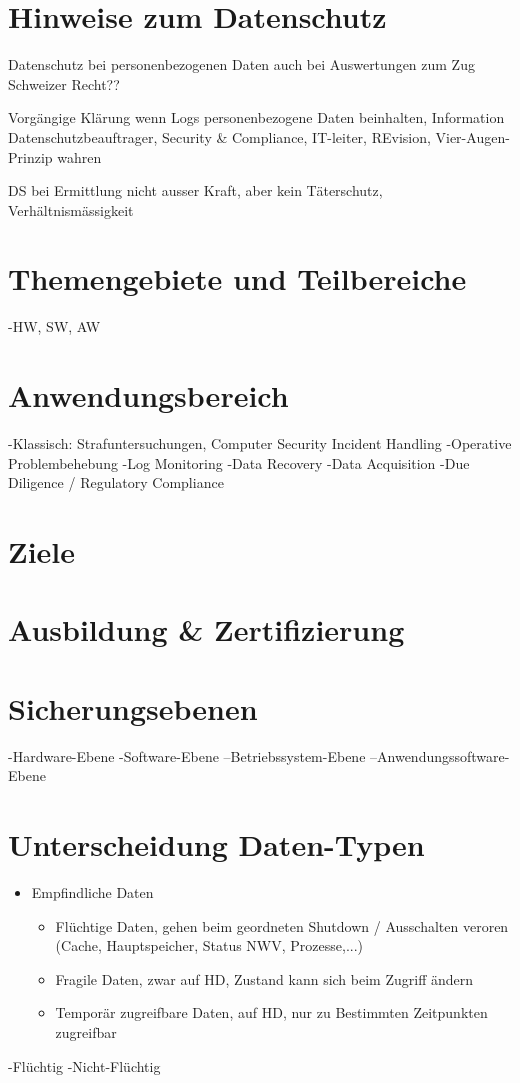 \section{Hinweise zum Datenschutz}
Datenschutz bei personenbezogenen Daten auch bei Auswertungen zum Zug
Schweizer Recht??

Vorgängige Klärung wenn Logs personenbezogene Daten beinhalten, Information Datenschutzbeauftrager, Security \& Compliance, IT-leiter, REvision, Vier-Augen-Prinzip wahren

DS bei Ermittlung nicht ausser Kraft, aber kein Täterschutz, Verhältnismässigkeit
\section{Themengebiete und Teilbereiche}
-HW, SW, AW
\section{Anwendungsbereich}

-Klassisch: Strafuntersuchungen, Computer Security Incident Handling
-Operative Problembehebung
-Log Monitoring
-Data Recovery
-Data Acquisition
-Due Diligence / Regulatory Compliance

\section{Ziele}

\section{Ausbildung \& Zertifizierung}


\section{Sicherungsebenen}
-Hardware-Ebene
-Software-Ebene
--Betriebssystem-Ebene
--Anwendungssoftware-Ebene

\section{Unterscheidung Daten-Typen}
\begin{itemize}
\item Empfindliche Daten
\begin{itemize}
\item Flüchtige Daten, gehen beim geordneten Shutdown / Ausschalten veroren (Cache, Hauptspeicher, Status NWV, Prozesse,...)
\item Fragile Daten, zwar auf HD, Zustand kann sich beim Zugriff ändern
\item Temporär zugreifbare Daten, auf HD, nur zu Bestimmten Zeitpunkten zugreifbar
\end{itemize}
\end{itemize}
-Flüchtig
-Nicht-Flüchtig

